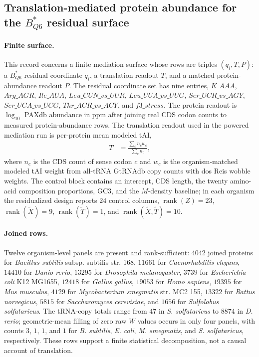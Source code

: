 \subsection{Translation-mediated protein abundance for the $B^{\ast}_{Q6}$ residual surface}
\label{sec:q6-translation-mediated-protein-abundance-cross-layer}

\paragraph{Finite surface.}
This record concerns a finite mediation surface whose rows are triples $(q_i,T,P)$: a $B^{\ast}_{Q6}$ residual coordinate $q_i$, a translation readout $T$, and a matched protein-abundance readout $P$.  The residual coordinate set has nine entries,
$K\_AAA$, $Arg\_AGR$, $Ile\_AUA$, $Leu\_CUN\_vs\_UUR$, $Leu\_UUA\_vs\_UUG$, $Ser\_UCR\_vs\_AGY$, $Ser\_UCA\_vs\_UCG$, $Thr\_ACR\_vs\_ACY$, and $f3\_stress$.  The protein readout is $\log_{10}$ PAXdb abundance in ppm after joining real CDS codon counts to measured protein-abundance rows.  The translation readout used in the powered mediation run is per-protein mean modeled tAI,
$$
\begin{aligned}
T &= \frac{\sum_c n_c w_c}{\sum_c n_c},
\end{aligned}
$$
where $n_c$ is the CDS count of sense codon $c$ and $w_c$ is the organism-matched modeled tAI weight from all-tRNA GtRNAdb copy counts with dos Reis wobble weights.  The control block contains an intercept, CDS length, the twenty amino-acid composition proportions, GC3, and the $M$-density baseline; in each organism the residualized design reports $24$ control columns, $\operatorname{rank}(Z)=23$, $\operatorname{rank}(\widetilde X)=9$, $\operatorname{rank}(\widetilde T)=1$, and $\operatorname{rank}(\widetilde X,\widetilde T)=10$.

\paragraph{Joined rows.}
Twelve organism-level panels are present and rank-sufficient: $4042$ joined proteins for \emph{Bacillus subtilis} subsp. subtilis str. 168, $11661$ for \emph{Caenorhabditis elegans}, $14410$ for \emph{Danio rerio}, $13295$ for \emph{Drosophila melanogaster}, $3739$ for \emph{Escherichia coli} K12 MG1655, $12418$ for \emph{Gallus gallus}, $19053$ for \emph{Homo sapiens}, $19395$ for \emph{Mus musculus}, $4129$ for \emph{Mycobacterium smegmatis} str. MC2 155, $13322$ for \emph{Rattus norvegicus}, $5815$ for \emph{Saccharomyces cerevisiae}, and $1656$ for \emph{Sulfolobus solfataricus}.  The tRNA-copy totals range from $47$ in \emph{S. solfataricus} to $8874$ in \emph{D. rerio}; geometric-mean filling of zero raw $W$ values occurs in only four panels, with counts $3$, $1$, $1$, and $1$ for \emph{B. subtilis}, \emph{E. coli}, \emph{M. smegmatis}, and \emph{S. solfataricus}, respectively.  These rows support a finite statistical decomposition, not a causal account of translation.

